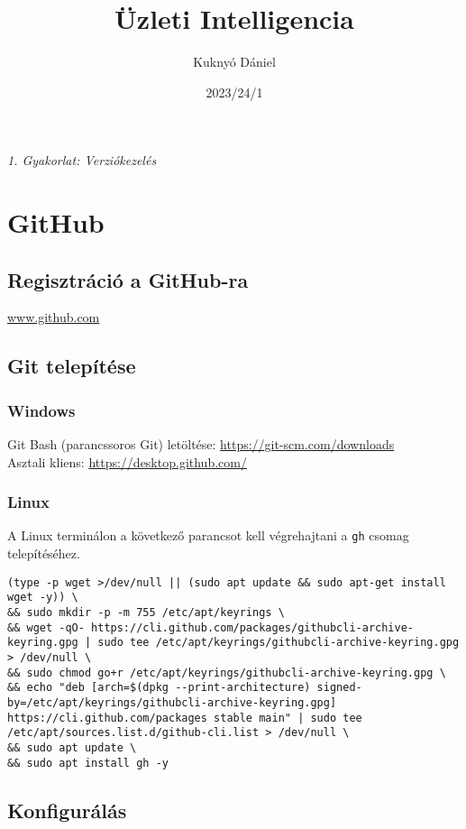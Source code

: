 \documentclass{article}
\title{\textcolor{DarkerBlue}{Üzleti Intelligencia}}
\author{\textcolor{DarkerBlue}{Kuknyó Dániel}}
\date{\textcolor{DarkerBlue}{2023/24/1}}
\begin{document}
\maketitle

\begin{center}
\large\textit{\textcolor{DarkerBlue}{1. Gyakorlat: Verziókezelés}}
\end{center}

\section{GitHub}
\subsection*{Regisztráció a GitHub-ra}
\href{www.github.com}{www.github.com}

\subsection*{Git telepítése}
\subsubsection*{Windows}
Git Bash (parancssoros Git) letöltése: \href{https://git-scm.com/downloads}{https://git-scm.com/downloads}\\
Asztali kliens: \href{https://desktop.github.com/}{https://desktop.github.com/}

\subsubsection*{Linux}
A Linux terminálon a következő parancsot kell végrehajtani a \texttt{gh} csomag telepítéséhez.
\begin{lstlisting}
(type -p wget >/dev/null || (sudo apt update && sudo apt-get install wget -y)) \
&& sudo mkdir -p -m 755 /etc/apt/keyrings \
&& wget -qO- https://cli.github.com/packages/githubcli-archive-keyring.gpg | sudo tee /etc/apt/keyrings/githubcli-archive-keyring.gpg > /dev/null \
&& sudo chmod go+r /etc/apt/keyrings/githubcli-archive-keyring.gpg \
&& echo "deb [arch=$(dpkg --print-architecture) signed-by=/etc/apt/keyrings/githubcli-archive-keyring.gpg] https://cli.github.com/packages stable main" | sudo tee /etc/apt/sources.list.d/github-cli.list > /dev/null \
&& sudo apt update \
&& sudo apt install gh -y
\end{lstlisting}

\subsection*{Konfigurálás}
\end{document}
